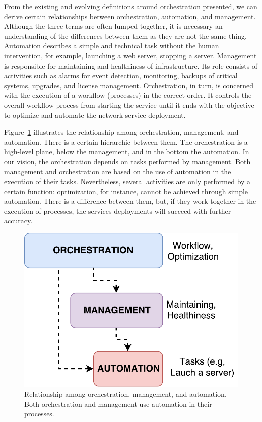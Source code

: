From the existing and evolving definitions around orchestration presented, we can derive certain relationships between orchestration, automation, and management. Although the three terms are often lumped together, it is necessary an understanding of the differences between them as they are not the same thing. Automation describes a simple and technical task without the human intervention, for example, launching a web server, stopping a server. Management is responsible for maintaining and healthiness of infrastructure. Its role consists of activities such as alarms for event detection, monitoring, backups of critical systems, upgrades, and license management. Orchestration, in turn, is concerned with the execution of a workflow (processes) in the correct order. It controls the overall workflow process from starting the service until it ends with the objective to optimize and automate the network service deployment. 

Figure~\ref{diff} illustrates the relationship among orchestration, management, and automation. There is a certain hierarchic between them. The orchestration is a high-level plane, below the management, and in the bottom the automation. In our vision, the orchestration depends on tasks performed by management. Both management and orchestration are based on the use of automation in the execution of their tasks. Nevertheless, several activities are only performed by a certain function: optimization, for instance, cannot be achieved through simple automation. There is a difference between them, but, if they work together in the execution of processes, the services deployments will succeed with further accuracy.

\begin{figure}[t]
    \centering
    \includegraphics[scale=.45]{Figures/02_Background/OrchManaAut}
      \caption{Relationship among orchestration, management, and automation. Both orchestration and management use automation in their processes.}
      \label{diff}
\end{figure}

